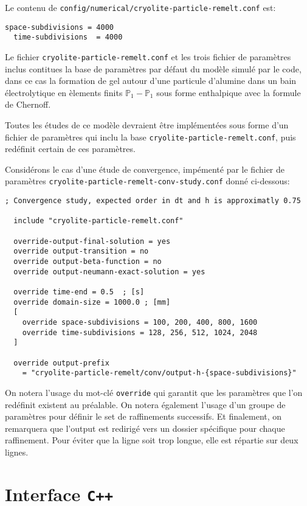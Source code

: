 Le contenu de \texttt{config/numerical/cryolite-\-particle-\-remelt.conf} est:
\begin{lstlisting}[language={},frame=single,basicstyle=\ttfamily]
  space-subdivisions = 4000
  time-subdivisions  = 4000
\end{lstlisting}

Le fichier \texttt{cryolite-particle-remelt.conf} et les trois fichier
de param\`etres inclus contitues la base de param\`etres par d\'efaut
du mod\`ele simul\'e par le code, dans ce cas la formation de gel
autour d'une particule d'alumine dans un bain \'electrolytique en
\`elements finits $\mathbb P_1-\mathbb P_1$ sous forme enthalpique
avec la formule de Chernoff.

Toutes les \'etudes de ce mod\`ele devraient \^etre impl\'ement\'ees
sous forme d'un fichier de param\`etres qui inclu la base
\texttt{cryolite-particle-remelt.conf}, puis red\'efinit certain de
ces param\`etres.

Consid\'erons le cas d'une \'etude de convergence, imp\'ement\'e par
le fichier de param\`etres
\texttt{cryolite-\-particle-\-remelt-\-conv-\-study.conf} donn\'e ci-dessous:
\begin{lstlisting}[language={},frame=single,basicstyle=\ttfamily]
  ; Convergence study, expected order in dt and h is approximatly 0.75
  
  include "cryolite-particle-remelt.conf"
  
  override-output-final-solution = yes
  override output-transition = no
  override output-beta-function = no
  override output-neumann-exact-solution = yes

  override time-end = 0.5  ; [s]
  override domain-size = 1000.0 ; [mm]
  [
    override space-subdivisions = 100, 200, 400, 800, 1600
    override time-subdivisions = 128, 256, 512, 1024, 2048
  ]

  override output-prefix
    = "cryolite-particle-remelt/conv/output-h-{space-subdivisions}"
\end{lstlisting}

On notera l'usage du mot-cl\'e \texttt{override} qui garantit que les
param\`etres que l'on red\'efinit existent au pr\'ealable.
On notera \'egalement l'usage d'un groupe de param\`etres pour
d\'efinir le set de raffinements successifs. Et finalement, on
remarquera que l'output est redirig\'e vers un dossier sp\'ecifique
pour chaque raffinement. Pour \'eviter que la ligne soit trop longue,
elle est r\'epartie sur deux lignes.

\section{Interface \texttt{C++}}\label{sec:api}
